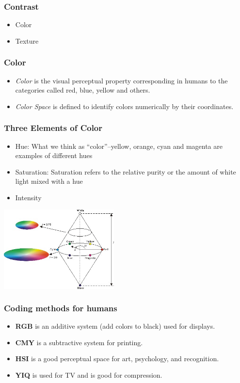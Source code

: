 \documentclass[notheorems,serif,table,compress]{beamer}  %
\begin{document}
\begin{frame}
\frametitle{{\color{magenta}} Contrast}
\begin{itemize}
\item Color
\item Texture
\end{itemize}
\end{frame}


\begin{frame}
\frametitle{Color}
\begin{itemize}
\item {\color{blue}\emph{Color}} is the visual perceptual property corresponding in humans to the categories called red, blue, yellow and others.
\item {\color{blue}\emph{Color Space}} is defined to identify colors numerically by their coordinates.
\end{itemize}
\end{frame}


\begin{frame}
\frametitle{Three Elements of Color}
\begin{itemize}
\item Hue: What we think as ``color''--yellow, orange, cyan and magenta are examples of different hues
\item Saturation: Saturation refers to the relative purity or the amount of white light mixed with a hue
\item Intensity
\end{itemize}
\centering\includegraphics[width=6cm]{HSIColorModel.jpg}
\end{frame}


\begin{frame}
\frametitle{Coding methods for humans}
\begin{itemize}
\item \textbf{RGB} is an additive system (add colors to black) used for displays.
\item \textbf{CMY} is a subtractive system for printing.
\item \textbf{HSI} is a good perceptual space for art, psychology, and recognition.
\item \textbf{YIQ} is used for TV and is good for compression. 
\end{itemize}
\end{frame}
\end{document}
